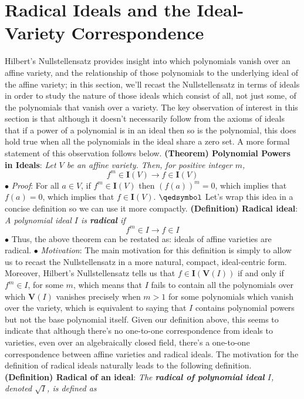 \documentclass{article}
\newcommand*{\tb}{\textbf}
\newcommand*{\ti}{\textit}
\newcommand*{\n}{\newline}
\newcommand*{\nn}{\newline \newline}
\newcommand*{\V}{\ensuremath{\mathbf{V}}}
\newcommand*{\I}{\ensuremath{\mathbf{I}}}
\begin{document}
\section{Radical Ideals and the Ideal-Variety Correspondence}
Hilbert's Nullstellensatz provides insight into which polynomials vanish over an affine variety, and the relationship of those polynomials to the underlying ideal of the affine variety; in this section, we'll recast the Nullstellensatz in terms of ideals in order to study the nature of those ideals which consist of all, not just some, of the polynomials that vanish over a variety. The key observation of interest in this section is that although it doesn't necessarily follow from the axioms of ideals that if a power of a polynomial is in an ideal then so is the polynomial, this does hold true when all the polynomials in the ideal share a zero set. A more formal statement of this observation follows below.
\nn
\tb{(Theorem) Polynomial Powers in Ideals}: \ti{Let $ V $ be an affine variety. Then, for positive integer $ m $,}
$$ f^m \in \I(V) \rightarrow f \in \I(V) $$
\indent $ \bullet $ \ti{Proof}: For all $ a \in V $, if $ f^m \in \I(V) $ then $ (f(a))^m = 0 $, which implies that $ f(a) = 0 $, which implies that $ f \in \I(V) $. $ \qedsymbol $
\nn
Let's wrap this idea in a concise definition so we can use it more compactly.
\nn
\tb{(Definition) Radical ideal}: \ti{A polynomial ideal $ I $ is \tb{radical} if}
$$ f^m \in I \rightarrow f \in I $$
\indent $ \bullet $ Thus, the above theorem can be restated as: ideals of affine varieties are radical.
\n
\indent $ \bullet $ \ti{Motivation}: The main motivation for this definition is simply to allow us to recast the Nullstellensatz in a more natural, compact, ideal-centric form. Moreover, Hilbert's Nullstellensatz tells us that $ f \in \I(\V(I)) $ if and only if $ f^m \in I $, for some $ m $, which means that $ I $ fails to contain all the polynomials over which $ \V(I) $ vanishes precisely when $ m > 1 $ for some polynomials which vanish over the variety, which is equivalent to saying that $ I $ contains polynomial powers but not the base polynomial itself. Given our definition above, this seems to indicate that although there's no one-to-one correspondence from ideals to varieties, even over an algebraically closed field, there's a one-to-one correspondence between affine varieties and radical ideals.
\nn
The motivation for the definition of radical ideals naturally leads to the following definition.
\nn
\tb{(Definition) Radical of an ideal}: \ti{The \tb{radical of polynomial ideal} $ I $, denoted $ \sqrt{I} $, is defined as}
\end{document}
